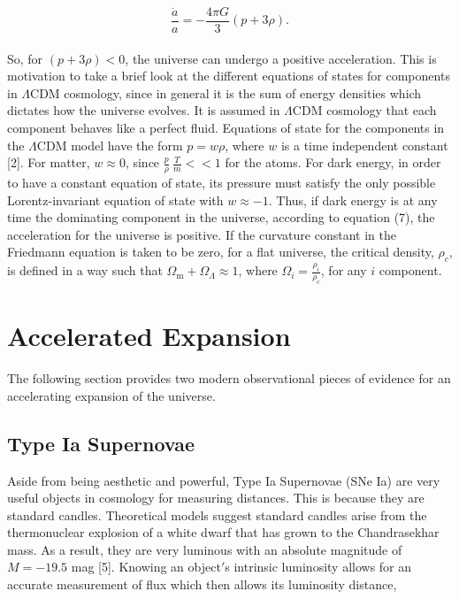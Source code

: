 \documentclass[12pt]{article}
\begin{document}
\begin{equation}
\frac{\ddot a}{a}=-\frac{4\pi G}{3}(p+3\rho).
\end{equation}
\\ 
So, for $(p+3\rho) < 0$, the universe can undergo a positive acceleration. This is motivation to take a brief look at the different equations of states for components in $\Lambda$CDM cosmology, since in general it is the sum of energy densities which dictates how the universe evolves. It is assumed in $\Lambda$CDM cosmology that each component behaves like a perfect fluid. Equations of state for the components in the $\Lambda$CDM model have the form $p=w\rho$, where $w$ is a time independent constant [2]. For matter, $w\approx0$, since $\frac{p}{\rho}~\frac{T}{m}<<1$ for the atoms. For dark energy, in order to have a constant equation of state, its pressure must satisfy the only possible Lorentz-invariant equation of state with $w\approx-1$. Thus, if dark energy is at any time the dominating component in the universe, according to equation (7), the acceleration for the universe is positive. If the curvature constant in the Friedmann equation is taken to be zero, for a flat universe, the critical density, $\rho_c$, is defined in a way such that $\Omega_\text{m}+\Omega_\Lambda \approx 1$, where $\Omega_i = \frac{\rho_i}{\rho_c}$, for any $i$ component.


		
	\section{Accelerated Expansion}
	The following section provides two modern observational pieces of evidence for an accelerating expansion of the universe. 
	\subsection{Type Ia Supernovae}
Aside from being aesthetic and powerful, Type Ia Supernovae (SNe Ia) are very useful objects in cosmology for measuring distances. This is because they are standard candles. Theoretical models suggest standard candles arise from the thermonuclear explosion of a white dwarf that has grown to the Chandrasekhar mass. As a result, they are very luminous with an absolute magnitude of $M = -19.5$ mag [5]. Knowing an object$'$s intrinsic luminosity allows for an accurate measurement of flux which then allows its luminosity distance,  
	
\end{document}
